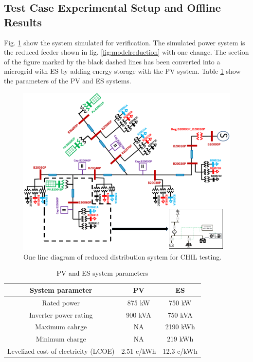 \subsection{Test Case Experimental Setup and Offline Results}
Fig. \ref{fig:simulation_grid} show the system simulated for verification. The simulated power system is the reduced feeder shown in fig. \ref{fig:modelreduction} with one change. The section of the figure marked by the black dashed lines has been converted into a microgrid with ES by adding energy storage with the PV system. Table \ref{tab:SYSTEM} show the parameters of the PV and ES systems.
\begin{figure}[!ht]
    \centering
    \includegraphics[width = 0.8\linewidth]{figs/simulation_grid.png}
    \caption{One line diagram of reduced distribution system for CHIL testing.}
    \label{fig:simulation_grid}
\end{figure}
\vspace{-2mm}


\begin{table}[htb]
\caption{PV and ES system parameters}
\label{tab:SYSTEM}
\centering
\begin{tabular}{|c|c|c|}
\hline
\textbf{System parameter}            & \textbf{PV} & \textbf{ES} \\ \hline
Rated power                          & 875 kW      & 750 kW      \\ \hline
Inverter power rating                & 900 kVA     & 750 kVA     \\ \hline
Maximum cahrge                       & NA          & 2190 kWh    \\ \hline
Minimum charge                       & NA          & 219 kWh     \\ \hline
Levelized cost of electricity (LCOE) & 2.51 c/kWh  & 12.3 c/kWh  \\ \hline
\end{tabular}
\end{table}
\vspace{-2mm}

